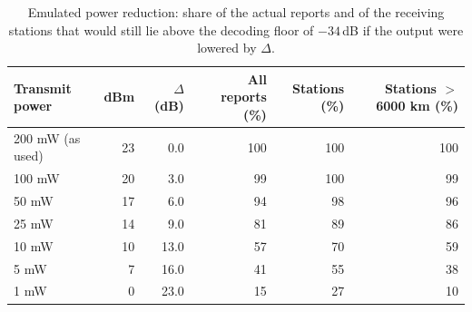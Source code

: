 \begin{table}[htbp]\centering\small
\caption{Emulated power reduction: share of the actual reports and of the receiving stations that would still lie above the decoding floor of $-34$\,dB if the output were lowered by $\Delta$.}\label{tab:wpower}
\begin{tabular}{lrrrrr}
\toprule
Transmit power & dBm & $\Delta$ (dB) & All reports (\%) & Stations (\%) & Stations $>$ 6000 km (\%) \\
\midrule
200 mW (as used) & 23 & 0.0 & 100 & 100 & 100 \\
100 mW & 20 & 3.0 & 99 & 100 & 99 \\
50 mW & 17 & 6.0 & 94 & 98 & 96 \\
25 mW & 14 & 9.0 & 81 & 89 & 86 \\
10 mW & 10 & 13.0 & 57 & 70 & 59 \\
5 mW & 7 & 16.0 & 41 & 55 & 38 \\
1 mW & 0 & 23.0 & 15 & 27 & 10 \\
\bottomrule
\end{tabular}
\end{table}
